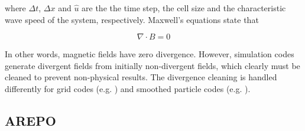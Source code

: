 \documentclass[11pt]{article}
\begin{document}
 where $\Delta t$, $\Delta x$ and $\hat{u}$ are the  the time step, the cell size and the characteristic wave speed of the system, respectively. Maxwell's equations state that 
 
 \begin{equation}
\nabla \cdot B = 0
\end{equation}

In other words, magnetic fields have zero divergence. However, simulation codes generate divergent fields from initially non-divergent fields, which clearly must be cleaned to prevent non-physical results. The divergence cleaning is handled differently for grid codes (e.g. \citealt{Jiang2012}) and smoothed particle codes (e.g. \citealt{Ziegler2006}).


\subsection{AREPO}
\label{sub:arepo}
\end{document}
